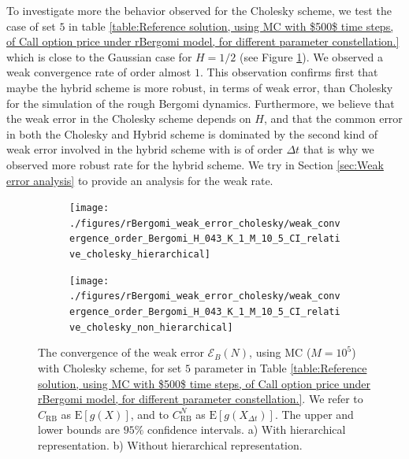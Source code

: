 \documentclass[11pt]{article}
\newcommand{\expt}[1]{\mathrm{E}\left[#1\right]}
\begin{document}
To investigate more the behavior observed for the Cholesky scheme, we test the case of set $5$ in table \ref{table:Reference solution, using MC with $500$ time steps, of Call option price under rBergomi model, for different parameter constellation.} which is close to the Gaussian case for $H=1/2$ (see Figure \ref{fig:Weak_rate_set1_set_5_without_rich}). We observed a weak convergence rate of order almost $1$. This observation confirms first that maybe the hybrid scheme is more robust, in terms of weak error, than Cholesky for the simulation of the rough Bergomi dynamics. Furthermore, we believe that the weak error in the Cholesky scheme depends on $H$, and  that the common error in both the Cholesky and Hybrid scheme is dominated by the second kind of weak error involved in the hybrid scheme with is of order $\Delta t $ that is why we observed more robust rate for the hybrid scheme. We try in Section \ref{sec:Weak error analysis} to provide an analysis for the weak rate.

\FloatBarrier
\begin{figure}[h!]
	\centering
	\begin{subfigure}{.5\textwidth}
		\centering
		\texttt{[image: ./figures/rBergomi\_weak\_error\_cholesky/weak\_convergence\_order\_Bergomi\_H\_043\_K\_1\_M\_10\_5\_CI\_relative\_cholesky\_hierarchical]}
		\caption{}
	\end{subfigure}%
	\begin{subfigure}{.5\textwidth}
		\centering
		\texttt{[image: ./figures/rBergomi\_weak\_error\_cholesky/weak\_convergence\_order\_Bergomi\_H\_043\_K\_1\_M\_10\_5\_CI\_relative\_cholesky\_non\_hierarchical]}
		\caption{}
	\end{subfigure}
	
	\caption{The  convergence of the weak error $\mathcal{E}_B(N)$, using MC ($M=10^5$) with Cholesky scheme, for set $5$ parameter in Table \ref{table:Reference solution, using MC with $500$ time steps, of Call option price under rBergomi model, for different parameter constellation.}. We refer to $C_{\text{RB}}$ as $\expt{g(X)}$, and to $C_{\text{RB}}^{N}$ as  $\expt{g(X_{\Delta t})}$. The upper and lower bounds are $95\%$ confidence intervals. a) With hierarchical representation.  b) Without hierarchical representation.}
	\label{fig:Weak_rate_set1_set_5_without_rich}
\end{figure}
\FloatBarrier

\end{document}
